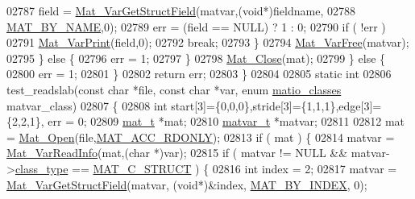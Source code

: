 \begin{DoxyCode}
{{{{{{{{02787                     field = \hyperlink{group___m_a_t_ga7018bfe6934b96ae32e8f2a1712eefab}{Mat\_VarGetStructField}(matvar,(\textcolor{keywordtype}{void}*)fieldname,
02788                                 \hyperlink{group___m_a_t_gga03158cf3a896ec3d4f306b5e920109b4a26c82f22528c705191141491a072db3e}{MAT\_BY\_NAME},0);
02789                     err = (field == NULL) ? 1 : 0;
02790                     \textcolor{keywordflow}{if} ( !err )
02791                         \hyperlink{group___m_a_t_ga9100c145e338b84b55d5d0795d5d390a}{Mat\_VarPrint}(field,0);
02792                     \textcolor{keywordflow}{break};
02793             \}
02794             \hyperlink{group___m_a_t_ga1d14716f7450530fd1c9d02413787f0e}{Mat\_VarFree}(matvar);
02795         \} \textcolor{keywordflow}{else} \{
02796             err = 1;
02797         \}
02798         \hyperlink{group___m_a_t_ga101c92ff7bde4a2d4615661beba09262}{Mat\_Close}(mat);
02799     \} \textcolor{keywordflow}{else} \{
02800         err = 1;
02801     \}
02802     \textcolor{keywordflow}{return} err;
02803 \}
02804 
02805 \textcolor{keyword}{static} \textcolor{keywordtype}{int}
02806 test\_readslab(\textcolor{keyword}{const} \textcolor{keywordtype}{char} *file, \textcolor{keyword}{const} \textcolor{keywordtype}{char} *var, \textcolor{keyword}{enum} \hyperlink{group___m_a_t_gad4d60ae7b709fc81bfd744fb4c857c40}{matio\_classes} matvar\_class)
02807 \{
02808     \textcolor{keywordtype}{int} start[3]=\{0,0,0\},stride[3]=\{1,1,1\},edge[3]=\{2,2,1\}, err = 0;
02809     \hyperlink{struct__mat__t}{mat\_t} *mat;
02810     \hyperlink{group___m_a_t_structmatvar__t}{matvar\_t} *matvar;
02811 
02812     mat = \hyperlink{group___m_a_t_gafbfedb5636a99f0ef867520c47f77d18}{Mat\_Open}(file,\hyperlink{group___m_a_t_ggaa9dcbc70f538af79bd557593ff6b5cdba8dd1457651b27ba9bea6cfba158c037c}{MAT\_ACC\_RDONLY});
02813     \textcolor{keywordflow}{if} ( mat ) \{
02814         matvar = \hyperlink{group___m_a_t_ga46da2e45ed96d3f1a6ec643757f2b086}{Mat\_VarReadInfo}(mat,(\textcolor{keywordtype}{char} *)var);
02815         \textcolor{keywordflow}{if} ( matvar != NULL && matvar->\hyperlink{group___m_a_t_aff13035bf3265dd7d9425e5d40c839d4}{class\_type} == \hyperlink{group___m_a_t_ggad4d60ae7b709fc81bfd744fb4c857c40acb467c7749c80902b798134c729bb521}{MAT\_C\_STRUCT} ) \{
02816             \textcolor{keywordtype}{int} index = 2;
02817             matvar = \hyperlink{group___m_a_t_ga7018bfe6934b96ae32e8f2a1712eefab}{Mat\_VarGetStructField}(matvar, (\textcolor{keywordtype}{void}*)&index, 
      \hyperlink{group___m_a_t_gga03158cf3a896ec3d4f306b5e920109b4a69c57994e272a363f56cb3ba888b047e}{MAT\_BY\_INDEX}, 0);
}}}}}}}}
\end{DoxyCode}
